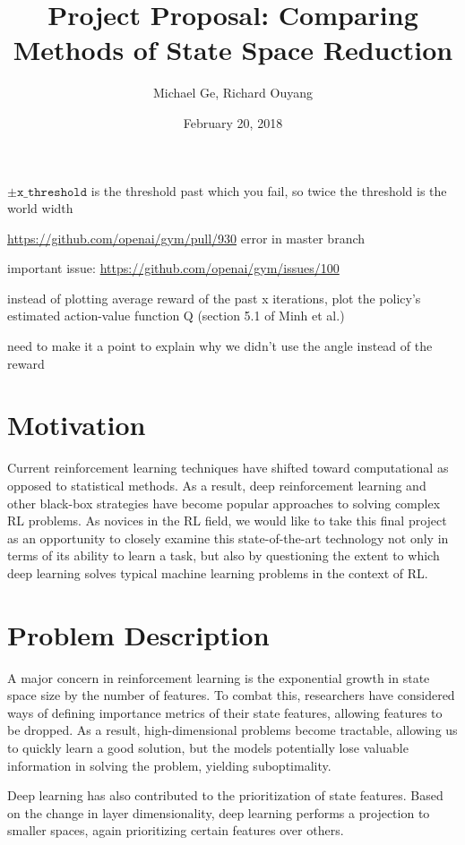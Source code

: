 \documentclass[11pt]{article}
\title{Project Proposal: Comparing Methods of State Space Reduction}
\author{Michael Ge, Richard Ouyang}
\date{February 20, 2018}
\begin{document}
$\pm \texttt{x\_threshold}$ is the threshold past which you fail, so twice the threshold is the world width

\url{https://github.com/openai/gym/pull/930} error in master branch

important issue: \url{https://github.com/openai/gym/issues/100}

instead of plotting average reward of the past x iterations, plot the policy's estimated action-value function Q (section 5.1 of Minh et al.)

need to make it a point to explain why we didn't use the angle instead of the reward

\maketitle

\section{Motivation}

Current reinforcement learning techniques have shifted toward computational as opposed to statistical methods. As a result, deep reinforcement learning and other black-box strategies have become popular approaches to solving complex RL problems. As novices in the RL field, we would like to take this final project as an opportunity to closely examine this state-of-the-art technology not only in terms of its ability to learn a task, but also by questioning the extent to which deep learning solves typical machine learning problems in the context of RL.

\section{Problem Description}

A major concern in reinforcement learning is the exponential growth in state space size by the number of features. To combat this, researchers have considered ways of defining importance metrics of their state features, allowing features to be dropped. As a result, high-dimensional problems become tractable, allowing us to quickly learn a good solution, but the models potentially lose valuable information in solving the problem, yielding suboptimality.

Deep learning has also contributed to the prioritization of state features. Based on the change in layer dimensionality, deep learning performs a projection to smaller spaces, again prioritizing certain features over others.
\end{document}
